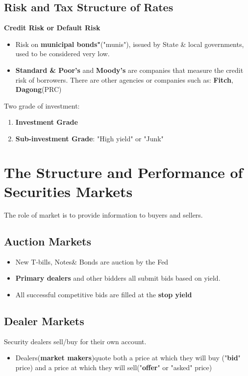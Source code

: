 \documentclass{article}
\theoremstyle{definition}
\theoremstyle{thrm}
\theoremstyle{lma}
\theoremstyle{ppst}
\theoremstyle{crlr}
\begin{document}
\subsection{Risk and Tax Structure of Rates}
\textbf{Credit Risk or Default Risk}
\begin{itemize}
	\item Risk on \textbf{municipal bonds"}("munis"), issued by State \& local governments, used to be considered very low.
	\item \textbf{Standard \& Poor's} and \textbf{Moody's} are companies that measure the credit risk of borrowers. There are other agencies or companies such as: \textbf{Fitch}, \textbf{Dagong}(PRC)
\end{itemize}
Two grade of investment:
\begin{enumerate}
	\item \textbf{Investment Grade}
	\item \textbf{Sub-investment Grade}: "High yield" or "Junk"
\end{enumerate}

\section{The Structure and Performance of Securities Markets}
The role of market is to provide information to buyers and sellers.
\subsection{Auction Markets}
\begin{itemize}
	\item New T-bills, Notes\& Bonds are auction by the Fed
	\item \textbf{Primary dealers} and other bidders all submit bids based on yield. 
	\item All successful competitive bids are filled at the \textbf{stop yield}
\end{itemize}

\subsection{Dealer Markets}
Security dealers sell/buy for their own account.
\begin{itemize}
	\item Dealers(\textbf{market makers})quote both a price at which they will buy ("\textbf{bid}" price) and a price at which they will sell("\textbf{offer}" or "asked" price)
\end{itemize}
\end{document}
